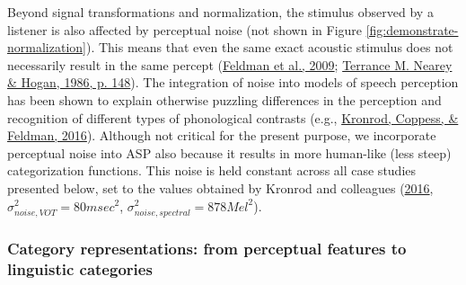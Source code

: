 \documentclass[
  11pt,
  english,
  man,floatsintext]{apa6}
\begin{document}
Beyond signal transformations and normalization, the stimulus observed by a listener is also affected by perceptual noise (not shown in Figure \ref{fig:demonstrate-normalization}). This means that even the same exact acoustic stimulus does not necessarily result in the same percept (\protect\hyperlink{ref-feldman2009}{Feldman et al., 2009}; \protect\hyperlink{ref-nearey-hogan1986}{Terrance M. Nearey \& Hogan, 1986, p. 148}). The integration of noise into models of speech perception has been shown to explain otherwise puzzling differences in the perception and recognition of different types of phonological contrasts (e.g., \protect\hyperlink{ref-kronrod2016}{Kronrod, Coppess, \& Feldman, 2016}). Although not critical for the present purpose, we incorporate perceptual noise into ASP also because it results in more human-like (less steep) categorization functions. This noise is held constant across all case studies presented below, set to the values obtained by Kronrod and colleagues (\protect\hyperlink{ref-kronrod2016}{2016}, \(\sigma^2_{noise, VOT}=80 msec^2\), \(\sigma^2_{noise, spectral}=878 Mel^2\)).

\hypertarget{sec:representations}{%
\subsubsection{Category representations: from perceptual features to linguistic categories}\label{sec:representations}}
\end{document}
